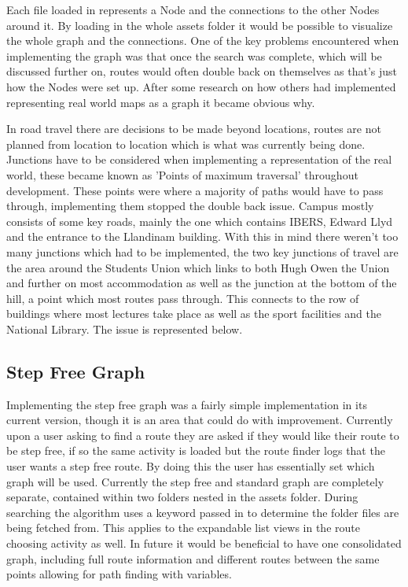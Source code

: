 Each file loaded in represents a Node and the connections to the other Nodes around it. By loading in the whole assets folder it would be possible to visualize the whole graph and the connections. One of the key problems encountered when implementing the graph was that once the search was complete, which will be discussed further on, routes would often double back on themselves as that's just how the Nodes were set up. After some research on how others had implemented representing real world maps as a graph it became obvious why.

In road travel there are decisions to be made beyond locations, routes are not planned from location to location which is what was currently being done. Junctions have to be considered when implementing a representation of the real world, these became known as 'Points of maximum traversal' throughout development. These points were where a majority of paths would have to pass through, implementing them stopped the double back issue. Campus mostly consists of some key roads, mainly the one which contains IBERS, Edward Llyd and the entrance to the Llandinam building. With this in mind there weren't too many junctions which had to be implemented, the two key junctions of travel are the area around the Students Union which links to both Hugh Owen the Union and further on most accommodation as well as the junction at the bottom of the hill, a point which most routes pass through. This connects to the row of buildings where most lectures take place as well as the sport facilities and the National Library. The issue is represented below.

\subsection{Step Free Graph}
Implementing the step free graph was a fairly simple implementation in its current version, though it is an area that could do with improvement. Currently upon a user asking to find a route they are asked if they would like their route to be step free, if so the same activity is loaded but the route finder logs that the user wants a step free route. By doing this the user has essentially set which graph will be used. Currently the step free and standard graph are completely separate, contained within two folders nested in the assets folder. During searching the algorithm uses a keyword passed in to determine the folder files are being fetched from. This applies to the expandable list views in the route choosing activity as well. In future it would be beneficial to have one consolidated graph, including full route information and different routes between the same points allowing for path finding with variables.  
\newpage
